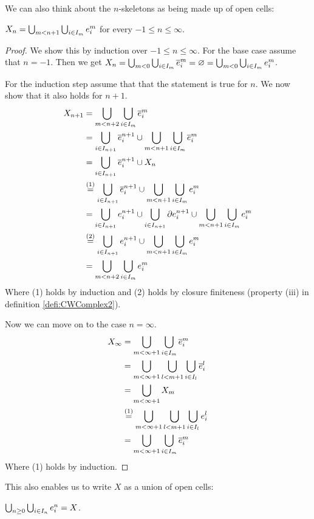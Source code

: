 We can also think about the $n$-skeletons as being made up of open cells: 

\begin{lem}
    $X_n = \bigcup_{m < n + 1}\bigcup_{i \in I_m} \ocell{m}{i}$ for every $-1 \le n \le \infty$.
\end{lem}
\begin{proof}
    We show this by induction over $-1 \le n \le \infty$. 
    For the base case assume that $n = -1$.
    Then we get $X_n = \bigcup_{m < 0}\bigcup_{i \in I_m}\ccell{m}{i} = \varnothing = \bigcup_{m < 0}\bigcup_{i \in I_m} \ocell{m}{i}$.

    For the induction step assume that that the statement is true for $n$.
    We now show that it also holds for $n + 1$.
    \begin{equation*}
        \begin{split}
            X_{n + 1} &= \bigcup_{m < n + 2}\bigcup_{i \in I_m} \ccell{m}{i} \\ 
            &=\bigcup_{i \in I_{n + 1}}\ccell{n+1}{i} \cup \bigcup_{m < n + 1}\bigcup_{i \in I_m} \ccell{m}{i} \\
            &= \bigcup_{i \in I_{n + 1}}\ccell{n+1}{i} \cup X_n \\
            &\stackrel{(1)}{=} \bigcup_{i \in I_{n + 1}}\ccell{n+1}{i} \cup \bigcup_{m < n + 1}\bigcup_{i \in I_m} \ocell{m}{i} \\ 
            &= \bigcup_{i \in I_{n + 1}}\ocell{n+1}{i} \cup \bigcup_{i \in I_{n + 1}}\ecell{n+1}{i} \cup \bigcup_{m < n + 1}\bigcup_{i \in I_m} \ocell{m}{i} \\
            &\stackrel{(2)}{=} \bigcup_{i \in I_{n + 1}}\ocell{n+1}{i} \cup \bigcup_{m < n + 1}\bigcup_{i \in I_m} \ocell{m}{i} \\
            &= \bigcup_{m < n + 2}\bigcup_{i \in I_m} \ocell{m}{i} 
        \end{split}
    \end{equation*}
    Where (1) holds by induction and (2) holds by closure finiteness (property (iii) in definition \ref{defi:CWComplex2}).

    Now we can move on to the case $n = \infty$.
    \begin{equation*}
        \begin{split}
            X_{\infty} &= \bigcup_{m < \infty + 1}\bigcup_{i \in I_m}\ccell{m}{i} \\
            &= \bigcup_{m < \infty + 1}\bigcup_{l < m + 1}\bigcup_{i \in I_l}\ccell{l}{i} \\
            &= \bigcup_{m < \infty + 1} X_m \\ 
            &\stackrel{(1)}{=} \bigcup_{m < \infty + 1}\bigcup_{l < m + 1}\bigcup_{i \in I_l}\ocell{l}{i} \\
            &= \bigcup_{m < \infty + 1}\bigcup_{i \in I_m}\ccell{m}{i} 
        \end{split}
    \end{equation*}
    Where (1) holds by induction.
\end{proof}

This also enables us to write $X$ as a union of open cells:

\begin{cor}
    $\bigcup_{n \ge 0}\bigcup_{i \in I_n} \ocell{n}{i} = X$.
\end{cor}
